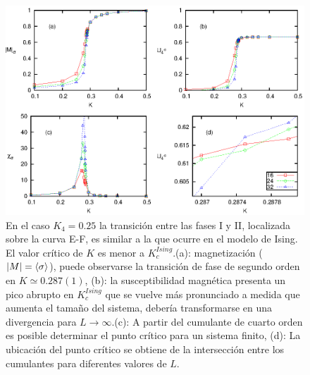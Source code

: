 \begin{figure}[h!]
\begin{center}
\includegraphics[scale=0.8]{graf/phases/multi_AT_I_II_c.eps}
\end{center}
\caption{En el caso $K_{4}=0.25$ la transición entre las fases I y II, localizada sobre la curva E-F, es similar a la que ocurre en el modelo de Ising.
 El valor crítico de $K$ es menor a $K_{c}^{Ising}$.(a): magnetización ($|M|=\langle \sigma \rangle$), puede observarse la transici\'on de fase de segundo orden en $K\simeq 0.287(1)$,
 (b): la susceptibilidad magn\'etica presenta un pico abrupto en $K_{c}^{Ising}$ que se vuelve m\'as pronunciado a medida que
 aumenta el tamaño del sistema, deber\'ia transformarse en una divergencia para $L\rightarrow \infty$.(c): A partir
 del cumulante de cuarto orden es posible determinar el punto cr\'itico para un sistema finito, (d): La ubicaci\'on del
 punto cr\'itico se obtiene de la intersecci\'on entre los cumulantes para diferentes valores de $L$.}
\label{fig:multi_AT_I_II_c}
\end{figure}

